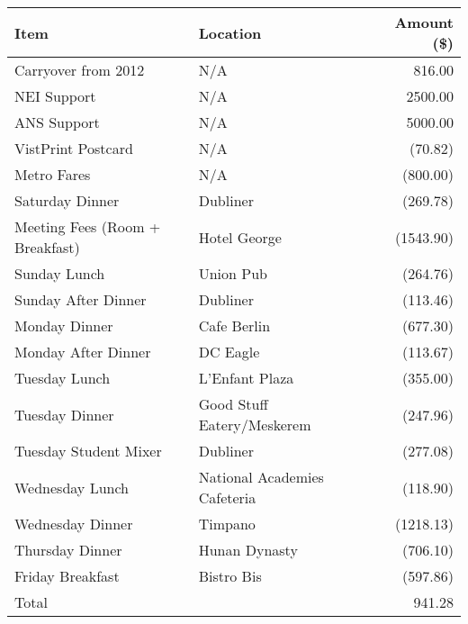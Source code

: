 
\begin{center}
\begin{tabular}{llr}
\toprule
Item                            & Location                     & Amount (\$) \\
\midrule
Carryover from 2012             & N/A                          & 816.00  \\
NEI Support                     & N/A                          & 2500.00 \\
ANS Support                     & N/A                          & 5000.00 \\ 
VistPrint Postcard              & N/A                          & (70.82) \\
Metro Fares                     & N/A                          & (800.00) \\
Saturday Dinner                 & Dubliner                     & (269.78) \\
Meeting Fees (Room + Breakfast) & Hotel George                 & (1543.90) \\
Sunday Lunch                    & Union Pub                    & (264.76) \\
Sunday After Dinner             & Dubliner                     & (113.46) \\
Monday Dinner                   & Cafe Berlin                  & (677.30) \\
Monday After Dinner             & DC Eagle                     & (113.67) \\
Tuesday Lunch                   & L'Enfant Plaza               & (355.00) \\
Tuesday Dinner                  & Good Stuff Eatery/Meskerem   & (247.96) \\
Tuesday Student Mixer           & Dubliner                     & (277.08) \\
Wednesday Lunch                 & National Academies Cafeteria & (118.90) \\
Wednesday Dinner                & Timpano                      & (1218.13) \\
Thursday Dinner                 & Hunan Dynasty                & (706.10) \\
Friday Breakfast                & Bistro Bis                   & (597.86) \\
\bottomrule                
Total                           &                              & 941.28 \footnotemark
\end{tabular}
\end{center}

